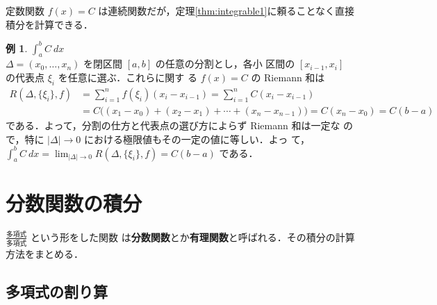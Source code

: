 \documentclass[10pt, uplatex, dvipdfmx]{jsarticle}
\theoremstyle{definition}
\newtheorem{example}[theorem]{例}
\numberwithin{equation}{section}
\newcommand{\ds}{\displaystyle}
\begin{document}
定数関数 $f(x) = C$ は連続関数だが，定理\ref{thm:integrable1}に頼ることなく直接積分を計算できる．
\begin{example}
  $\ds \int_{a}^{b} C \ dx$\\

  $\Delta = (x_0, \ldots, x_n)$ を閉区間 $[a,b]$ の任意の分割とし，各小
  区間の $[x_{i-1}, x_{i}]$ の代表点 $\xi_i$ を任意に選ぶ．これらに関す
  る $f(x) = C$ の Riemann 和は
  \[
    \begin{aligned}
      R(\Delta, \{\xi_i\}, f) &= \sum_{i=1}^{n} f(\xi_i) (x_i - x_{i-1}) = \sum_{i=1}^{n} C (x_{i}-x_{i-1})\\[2ex]
                              & = C \Big( (x_1-x_0) + (x_2-x_1) + \cdots + (x_n-x_{n-1}) \Big)
                                = C(x_n-x_0) = C(b-a)
    \end{aligned}
  \]
  である．よって，分割の仕方と代表点の選び方によらず Riemann 和は一定な
  ので，特に $|\Delta|\to 0$ における極限値もその一定の値に等しい．よっ
  て，$\ds \int_{a}^{b} C \ dx = \lim_{|\Delta| \to 0} R(\Delta, \{\xi_i\}, f) = C(b-a)$ である．
\end{example}

\newpage

\section{分数関数の積分}

$\ds \frac{\text{多項式}}{\text{多項式}}$ という形をした関数
は\textbf{分数関数}とか\textbf{有理関数}と呼ばれる．その積分の計算方法をまとめる．

\subsection{多項式の割り算}\label{subsec:division}
\end{document}
